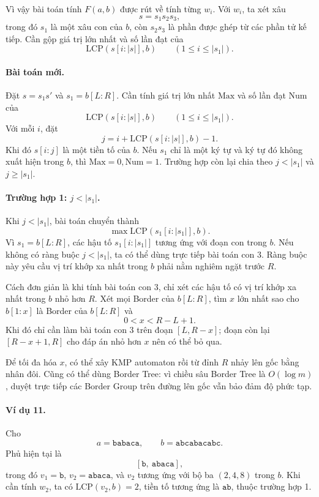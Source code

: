 \documentclass[11pt]{article}
\begin{document}
Vì vậy bài toán tính \(F(a,b)\) được rút về tính từng \(w_i\). Với \(w_i\), ta
xét xâu
\[
  s=s_1s_2s_3,
\]
trong đó \(s_1\) là một xâu con của \(b\), còn \(s_2s_3\) là phần được ghép từ
các phần tử kế tiếp. Cần gộp giá trị lớn nhất và số lần đạt của
\[
  \mathrm{LCP}(s[i:|s|],b)\qquad (1\le i\le |s_1|).
\]

\paragraph{Bài toán mới.}
Đặt \(s=s_1s'\) và \(s_1=b[L:R]\). Cần tính giá trị lớn nhất
\(\mathrm{Max}\) và số lần đạt \(\mathrm{Num}\) của
\[
  \mathrm{LCP}(s[i:|s|],b)\qquad (1\le i\le |s_1|).
\]
Với mỗi \(i\), đặt
\[
  j=i+\mathrm{LCP}(s[i:|s|],b)-1.
\]
Khi đó \(s[i:j]\) là một tiền tố của \(b\). Nếu \(s_1\) chỉ là một ký tự và ký
tự đó không xuất hiện trong \(b\), thì \(\mathrm{Max}=0,\mathrm{Num}=1\).
Trường hợp còn lại chia theo \(j<|s_1|\) và \(j\ge |s_1|\).

\paragraph{Trường hợp 1: \(j<|s_1|\).}
Khi \(j<|s_1|\), bài toán chuyển thành
\[
  \max \mathrm{LCP}(s_1[i:|s_1|],b).
\]
Vì \(s_1=b[L:R]\), các hậu tố \(s_1[i:|s_1|]\) tương ứng với đoạn con trong
\(b\). Nếu không có ràng buộc \(j<|s_1|\), ta có thể dùng trực tiếp bài toán con
3. Ràng buộc này yêu cầu vị trí khớp xa nhất trong \(b\) phải nằm nghiêm ngặt
trước \(R\).

Cách đơn giản là khi tính bài toán con 3, chỉ xét các hậu tố có vị trí khớp xa
nhất trong \(b\) nhỏ hơn \(R\). Xét mọi Border của \(b[L:R]\), tìm \(x\) lớn
nhất sao cho \(b[1:x]\) là Border của \(b[L:R]\) và
\[
  0<x<R-L+1.
\]
Khi đó chỉ cần làm bài toán con 3 trên đoạn \([L,R-x]\); đoạn còn lại
\([R-x+1,R]\) cho đáp án nhỏ hơn \(x\) nên có thể bỏ qua.

Để tối đa hóa \(x\), có thể xây KMP automaton rồi từ đỉnh \(R\) nhảy lên gốc
bằng nhân đôi. Cũng có thể dùng Border Tree: vì chiều sâu Border Tree là
\(O(\log m)\), duyệt trực tiếp các Border Group trên đường lên gốc vẫn bảo đảm
độ phức tạp.

\paragraph{Ví dụ 11.}
Cho
\[
  a=\texttt{babaca},\qquad b=\texttt{abcabacabc}.
\]
Phủ hiện tại là
\[
  [\texttt{b},\ \texttt{abaca}],
\]
trong đó \(v_1=\texttt{b}\), \(v_2=\texttt{abaca}\), và \(v_2\) tương ứng với bộ
ba \((2,4,8)\) trong \(b\). Khi cần tính \(w_2\), ta có
\(\mathrm{LCP}(v_2,b)=2\), tiền tố tương ứng là \(\texttt{ab}\), thuộc trường
hợp 1.
\end{document}
